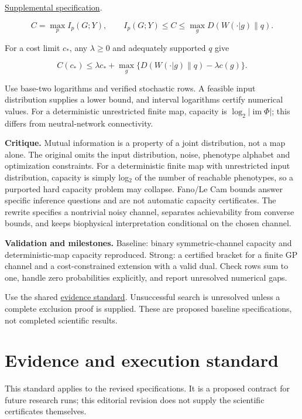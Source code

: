 \documentclass[
  11pt,
]{article}
\begin{document}
\href{https://github.com/rick-stevens-ai/Pure-Thought/blob/main/supplemental/S12.md}{Supplemental
specification}.

\[C=\max_p I_p(G;Y),\qquad
I_p(G;Y)\le C\le\max_g D(W(\cdot|g)\|q).\]

For a cost limit \(c_*\), any \(\lambda\ge0\) and adequately supported
\(q\) give

\[C(c_*)\le\lambda c_*+
\max_g\{D(W(\cdot|g)\|q)-\lambda c(g)\}.\]

Use base-two logarithms and verified stochastic rows. A feasible input
distribution supplies a lower bound, and interval logarithms certify
numerical values. For a deterministic unrestricted finite map, capacity
is \(\log_2|\operatorname{im}\Phi|\); this differs from neutral-network
connectivity.

\textbf{Critique.} Mutual information is a property of a joint
distribution, not a map alone. The original omits the input
distribution, noise, phenotype alphabet and optimization constraints.
For a deterministic finite map with unrestricted input distribution,
capacity is simply log\ensuremath{{}_{2}} of the number of reachable
phenotypes, so a purported hard capacity problem may collapse. Fano/Le
Cam bounds answer specific inference questions and are not automatic
capacity certificates. The rewrite specifies a nontrivial noisy channel,
separates achievability from converse bounds, and keeps biophysical
interpretation conditional on the chosen channel.

\textbf{Validation and milestones.} Baseline: binary symmetric-channel
capacity and deterministic-map capacity reproduced. Strong: a certified
bracket for a finite GP channel and a cost-constrained extension with a
valid dual. Check rows sum to one, handle zero probabilities explicitly,
and report unresolved numerical gaps.

Use the shared
\href{https://github.com/rick-stevens-ai/Pure-Thought/blob/main/reviews/EVIDENCE-STANDARD.md}{evidence
standard}. Unsuccessful search is unresolved unless a complete exclusion
proof is supplied. These are proposed baseline specifications, not
completed scientific results.

\section{Evidence and execution standard}

This standard applies to the revised specifications. It is a proposed
contract for future research runs; this editorial revision does not
supply the scientific certificates themselves.
\end{document}
